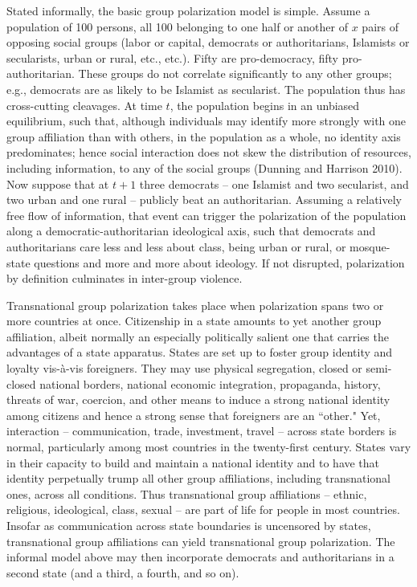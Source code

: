 \documentclass[12pt]{article}
\begin{document}
Stated informally, the basic group polarization model is simple.  Assume a population of 100 persons, all 100 belonging to one half or another of $x$ pairs of opposing social groups (labor or capital, democrats or authoritarians, Islamists or secularists, urban or rural, etc., etc.).  Fifty are pro-democracy, fifty pro-authoritarian.  These groups do not correlate significantly to any other groups; e.g., democrats are as likely to be Islamist as secularist.  The population thus has cross-cutting cleavages.   At time $t$, the population begins in an unbiased equilibrium, such that, although individuals may identify more strongly with one group affiliation than with others, in the population as a whole, no identity axis predominates; hence social interaction does not skew the distribution of resources, including information, to any of the social groups (Dunning and Harrison 2010).  Now suppose that at $t+1$ three democrats – one Islamist and two secularist, and two urban and one rural – publicly beat an authoritarian.  Assuming a relatively free flow of information, that event can trigger the polarization of the population along a democratic-authoritarian ideological axis, such that democrats and authoritarians care less and less about class, being urban or rural, or mosque-state questions and more and more about ideology.  If not disrupted, polarization by definition culminates in inter-group violence.

Transnational group polarization takes place when polarization spans two or more countries at once.  Citizenship in a state amounts to yet another group affiliation, albeit normally an especially politically salient one that carries the advantages of a state apparatus.  States are set up to foster group identity and loyalty vis-à-vis foreigners.  They may use physical segregation, closed or semi-closed national borders, national economic integration, propaganda, history, threats of war, coercion, and other means to induce a strong national identity among citizens and hence a strong sense that foreigners are an ``other."  Yet, interaction – communication, trade, investment, travel – across state borders is normal, particularly among most countries in the twenty-first century.   States vary in their capacity to build and maintain a national identity and to have that identity perpetually trump all other group affiliations, including transnational ones, across all conditions.   Thus transnational group affiliations – ethnic, religious, ideological, class, sexual – are part of life for people in most countries.  Insofar as communication across state boundaries is uncensored by states, transnational group affiliations can yield transnational group polarization.  The informal model above may then incorporate democrats and authoritarians in a second state (and a third, a fourth, and so on).
\end{document}
